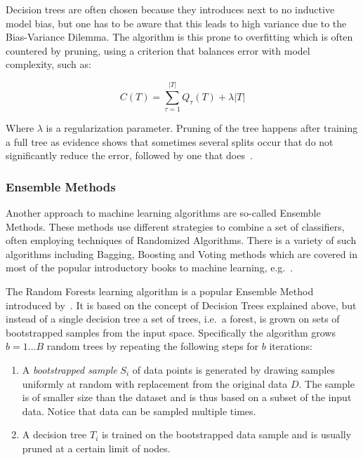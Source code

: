 Decision trees are often chosen because they introduces next to no inductive model bias, but one has to be aware that this leads to high variance due to the Bias-Variance Dilemma. The algorithm is this prone to overfitting which is often countered by pruning, using a criterion that balances error with model complexity, such as:

\begin{equation}
  C(T) = \sum_{\tau=1}^{|T|} Q_{\tau}(T) + \lambda |T|
\end{equation}

Where $\lambda$ is a regularization parameter. Pruning of the tree happens after training a full tree as evidence shows that sometimes several splits occur that do not significantly reduce the error, followed by one that does~\cite[Chapter 14.4, p.~664]{Bishop:2006aa}.

\subsubsection{Ensemble Methods}
\label{subs:Ensemble Methods}

Another approach to machine learning algorithms are so-called \glspl{Ensemble Method}. These methods use different strategies to combine a set of classifiers, often employing techniques of \glspl{Randomized Algorithm}. There is a variety of such algorithms including \gls{Bagging}, \gls{Boosting} and \gls{Voting} methods which are covered in most of the popular introductory books to machine learning, e.g.~\cite{Bishop:2006aa}.

The Random Forests learning algorithm is a popular \gls{Ensemble Method} introduced by~\cite{Breiman:aa}. It is based on the concept of Decision Trees explained above, but instead of a single decision tree a set of trees, i.e.\ a forest, is grown on sets of bootstrapped samples from the input space. Specifically the algorithm grows $b = 1 \ldots B$ random trees by repeating the following steps for $b$ iterations:

\begin{enumerate}
  \item A \emph{bootstrapped sample} $S_i$ of data points is generated by drawing samples uniformly at random with replacement from the original data $D$. The sample is of smaller size than the dataset and is thus based on a subset of the input data. Notice that data can be sampled multiple times.
  \item A decision tree $T_i$ is trained on the bootstrapped data sample and is usually pruned at a certain limit of nodes.
\end{enumerate}

